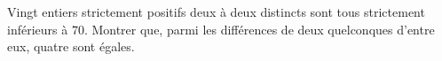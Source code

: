 Vingt entiers strictement positifs deux à deux distincts sont tous strictement inférieurs à $70$. Montrer que, parmi les différences de deux quelconques d'entre eux, quatre sont égales.

